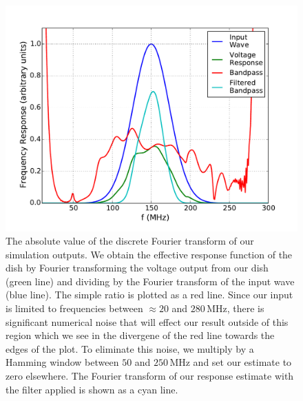 \documentclass[onecolumn]{emulateapj}
\begin{document}
\begin{figure}[h!]
\includegraphics[width=.5\textwidth]{figures/frequency_domain.pdf}
\caption{The absolute value of the discrete Fourier transform of our simulation outputs. We obtain the effective response function of the dish by Fourier transforming the voltage output from our dish (green line) and dividing by the Fourier transform of the input wave (blue line). The simple ratio is plotted as a red line. Since our input is limited to frequencies between $\approx 20$ and $280$\,MHz, there is significant numerical noise that will effect our result outside of this region which we see in the divergene of the red line towards the edges of the plot. To eliminate this noise, we multiply by a Hamming window between $50$ and $250$\,MHz and set our estimate to zero elsewhere. The Fourier transform of our response estimate with the filter applied is shown as a cyan line.}
\label{fig:FrequencyDomain}
\end{figure}
\end{document}
